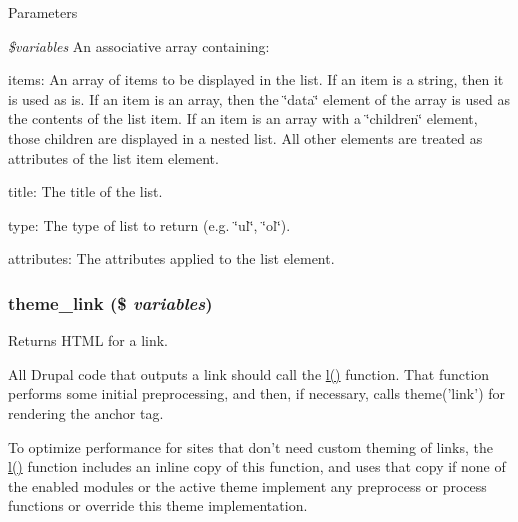 \begin{DoxyParams}{Parameters}
\item[{\em \$variables}]An associative array containing:
\begin{DoxyItemize}
\item items: An array of items to be displayed in the list. If an item is a string, then it is used as is. If an item is an array, then the \char`\"{}data\char`\"{} element of the array is used as the contents of the list item. If an item is an array with a \char`\"{}children\char`\"{} element, those children are displayed in a nested list. All other elements are treated as attributes of the list item element.
\item title: The title of the list.
\item type: The type of list to return (e.g. \char`\"{}ul\char`\"{}, \char`\"{}ol\char`\"{}).
\item attributes: The attributes applied to the list element. 
\end{DoxyItemize}\end{DoxyParams}
\hypertarget{group__themeable_ga4ab7d25ecbea3d5367e75c965f7afe55}{
\subsubsection[{theme\_\-link}]{\setlength{\rightskip}{0pt plus 5cm}theme\_\-link (\$ {\em variables})}}
\label{group__themeable_ga4ab7d25ecbea3d5367e75c965f7afe55}
Returns HTML for a link.

All Drupal code that outputs a link should call the \hyperlink{common_8inc_ad3b36c06dc46250b8d22b8d0d2e7bd97}{l()} function. That function performs some initial preprocessing, and then, if necessary, calls theme('link') for rendering the anchor tag.

To optimize performance for sites that don't need custom theming of links, the \hyperlink{common_8inc_ad3b36c06dc46250b8d22b8d0d2e7bd97}{l()} function includes an inline copy of this function, and uses that copy if none of the enabled modules or the active theme implement any preprocess or process functions or override this theme implementation.


